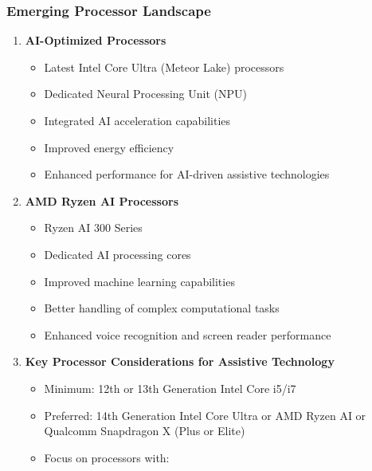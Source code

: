 \subsubsection{Emerging Processor Landscape}

\begin{enumerate}

\item \textbf{AI-Optimized Processors}

\begin{itemize}
\item Latest Intel Core Ultra (Meteor Lake) processors \cite{IntelMeteorLake}
\item Dedicated Neural Processing Unit (NPU) \cite{IntelNPU}
\item Integrated AI acceleration capabilities \cite{IntelAIAcceleration}
\item Improved energy efficiency \cite{IntelPowerEfficiency}
\item Enhanced performance for AI-driven assistive technologies \cite{AIinAccessibility}
\end{itemize}

\item \textbf{AMD Ryzen AI Processors}

\begin{itemize}
\item Ryzen AI 300 Series \cite{AMDRyzenAI300}
\item Dedicated AI processing cores \cite{AMDAIProcessing}
\item Improved machine learning capabilities \cite{AMDMachineLearning}
\item Better handling of complex computational tasks \cite{AMDRyzenPerformance}
\item Enhanced voice recognition and screen reader performance \cite{AIinAccessibility}
\end{itemize}

\item \textbf{Key Processor Considerations for Assistive Technology}

\begin{itemize}
\item Minimum: 12th or 13th Generation Intel Core i5/i7 \cite{IntelCoreRequirements}
\item Preferred: 14th Generation Intel Core Ultra or AMD Ryzen AI or Qualcomm Snapdragon X (Plus or Elite) \cite{IntelMeteorLake, AMDRyzenAI, QualcommSnapdragonX}
\item Focus on processors with:


\end{itemize}
\end{enumerate}
